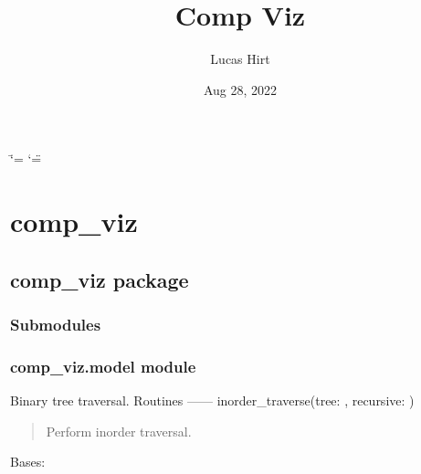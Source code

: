 \documentclass[letterpaper,10pt,english]{sphinxmanual}
\title{Comp Viz}
\date{Aug 28, 2022}
\author{Lucas Hirt}
\begin{document}
\ifdefined\shorthandoff
  \ifnum\catcode`\=\string=\active\shorthandoff{=}\fi
  \ifnum\catcode`\"=\active{}\fi
\fi

\pagestyle{empty}
\sphinxmaketitle
\pagestyle{plain}
\sphinxtableofcontents
\pagestyle{normal}
\label{\detokenize{index::doc}}


\sphinxstepscope


\chapter{comp\_viz}
\label{\detokenize{modules:comp-viz}}\label{\detokenize{modules::doc}}
\sphinxstepscope


\section{comp\_viz package}
\label{\detokenize{comp_viz:comp-viz-package}}\label{\detokenize{comp_viz::doc}}

\subsection{Submodules}
\label{\detokenize{comp_viz:submodules}}

\subsection{comp\_viz.model module}
\label{\detokenize{comp_viz:module-comp_viz.model}}\label{\detokenize{comp_viz:comp-viz-model-module}}
\sphinxAtStartPar
Binary tree traversal.
Routines
——\textendash{}
inorder\_traverse(tree: , recursive: )
\begin{quote}

\sphinxAtStartPar
Perform in\sphinxhyphen{}order traversal.
\end{quote}

\begin{fulllineitems}
\label{\detokenize{comp_viz:comp_viz.model.Model}}
\pysigstartsignatures
{}
\pysigstopsignatures
\sphinxAtStartPar
Bases: 

\end{fulllineitems}
\end{document}
